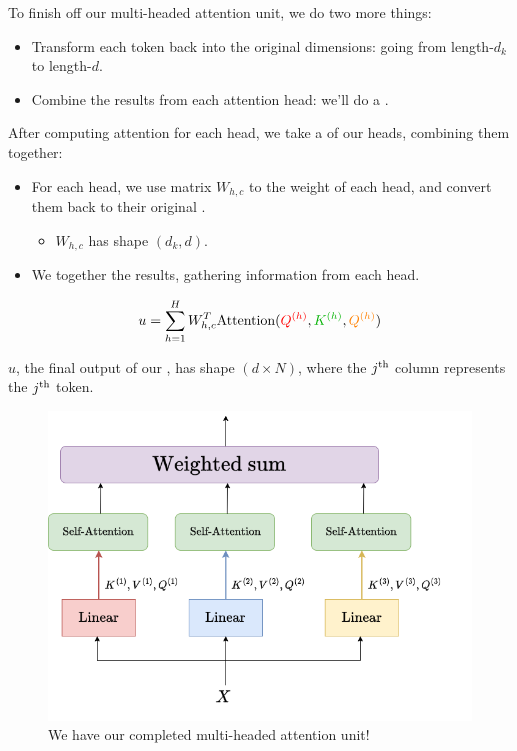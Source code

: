         To finish off our multi-headed attention unit, we do two more things:

        \begin{itemize}
            \item Transform each token back into the original dimensions: going from length-$d_k$ to length-$d$.
            \item Combine the results from each attention head: we'll do a .\\
        \end{itemize}

        \begin{kequation}
            After computing attention for each head, we take a  of our heads, combining them together:

            \begin{itemize}
                \item For each head, we use matrix $W_{h,c}$ to  the weight of each head, and convert them back to their original .
                    \begin{itemize}
                        \item $W_{h,c}$ has shape $(d_k, d)$.
                    \end{itemize}
                \item We  together the results, gathering information from each head.
            \end{itemize}

            $$u = \sum_{h=1}^{H} W_{h,c}^T \text{Attention}(\red{\ex{Q}{h}}, \grn{\ex{K}{h}}, \org{\ex{Q}{h}})$$ 

            $u$, the final output of our , has shape $(d \times N)$, where the $j^{ \text{th} }$ column represents the $j^{ \text{th} }$ token.
        \end{kequation}

        \begin{figure}[H]
            \centering
            \includegraphics[width=0.5\linewidth]{images/transformers_images/multi_headed_attention_complete.png}
            \caption*{We have our completed multi-headed attention unit!}
        \end{figure}

